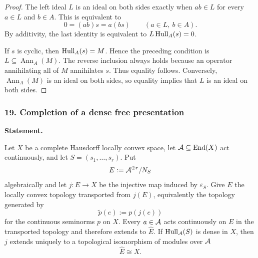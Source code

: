\begin{proof}
The left ideal $L$ is an ideal on both sides exactly when $ab\in L$ for every $a\in L$ and $b\in A$.  This is equivalent to
\[
0=(ab)s=a(bs)
\qquad(a\in L,\ b\in A).
\]
By additivity, the last identity is equivalent to $L\operatorname{Hull}_A(s)=0$.

If $s$ is cyclic, then $\operatorname{Hull}_A(s)=M$.  Hence the preceding condition is $L\subseteq\operatorname{Ann}_A(M)$.  The reverse inclusion always holds because an operator annihilating all of $M$ annihilates $s$.  Thus equality follows.  Conversely, $\operatorname{Ann}_A(M)$ is an ideal on both sides, so equality implies that $L$ is an ideal on both sides.
\end{proof}
\subsubsection*{19. Completion of a dense free presentation}
\label{rec:PSC-I-T-COMPLETED-PRESENTATION}
\textbf{Statement.}\par
Let $X$ be a complete Hausdorff locally convex space, let $\mathcal A\subseteq\operatorname{End}(X)$ act continuously, and let $S=(s_1,\ldots,s_r)$.  Put
\[
E:=\mathcal A^{\oplus r}/N_S
\]
algebraically and let $j:E\to X$ be the injective map induced by $\varepsilon_S$.  Give $E$ the locally convex topology transported from $j(E)$, equivalently the topology generated by
\[
\widetilde p(e):=p(j(e))
\]
for the continuous seminorms $p$ on $X$.  Every $a\in\mathcal A$ acts continuously on $E$ in the transported topology and therefore extends to $\widehat E$.  If $\operatorname{Hull}_{\mathcal A}(S)$ is dense in $X$, then $j$ extends uniquely to a topological isomorphism of modules over $\mathcal A$
\[
\boxed{\widehat E\cong X.}
\]

